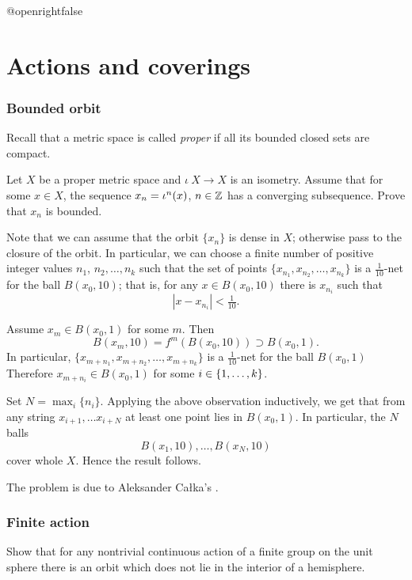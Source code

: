 \csname @openrightfalse\endcsname
\chapter{Actions and coverings}

\subsection*{Bounded orbit}
\label{Bounded orbit}

Recall that a metric space is called \emph{proper} if all its bounded closed sets are compact.

\begin{pr} Let $X$ be a 
proper metric space 
and $\iota\:X\to X$ is an isometry.
Assume that for some $x\in X$, the sequence $x_n\z=\iota^n(x)$, $n\in\mathbb{Z}$ has a converging subsequence.
Prove that $x_n$ is bounded.
\end{pr}

Note that we can assume that the orbit $\{x_n\}$ is dense in $X$;
otherwise pass to the closure of the orbit.
In particular, we can choose a finite number of positive integer values $n_1$, $n_2,\dots,n_k$
such that the set of points $\{x_{n_1},x_{n_2},\dots,x_{n_k}\}$ is a $\tfrac1{10}$-net for the ball $B(x_0,10)$;
that is, for any $x\in B(x_0,10)$ there is $x_{n_i}$ such that
\[|x-x_{n_i}|<\tfrac1{10}.\]

Assume $x_m\in B(x_0,1)$ for some $m$.
Then \[B(x_m,10)=f^m( B(x_0,10))\supset B(x_0,1).\] 
In particular, $\{x_{m+n_1},x_{m+n_2},\dots,x_{m+n_k}\}$ is a $\tfrac1{10}$-net for the ball $B(x_0,1)$
Therefore $x_{m+n_i}\in B(x_0,1)$ for some $i\z\in\{1,\dots,k\}$.

Set $N=\max_i\{n_i\}$.
Applying the above observation inductively, we get that from any string $x_{i+1},\dots x_{i+N}$
at least one point lies in $B(x_0,1)$.
In particular, the $N$ balls
\[B(x_1,10),\dots,B(x_N,10)\]
cover whole $X$.
Hence the result follows.\qeds

The problem is due to Aleksander Ca{\l}ka's \cite[see][]{calka}.

\subsection*{Finite action}\label{Finite action}

\begin{pr}
Show that for any nontrivial continuous action of a finite group on the unit sphere
there is an orbit which does not lie in the interior of a hemisphere.
\end{pr}

